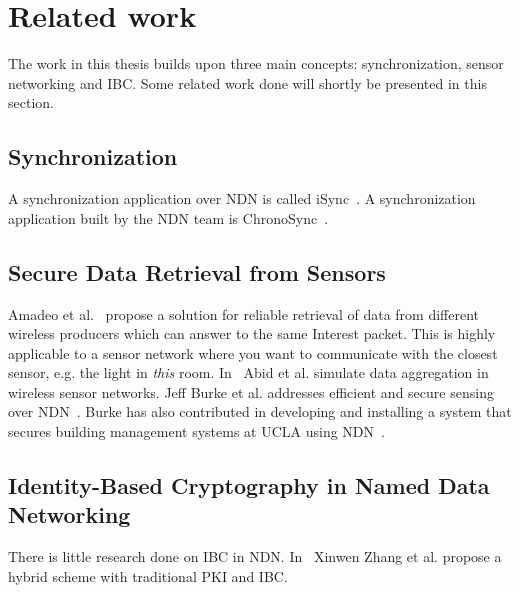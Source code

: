 \section{Related work}
The work in this thesis builds upon three main concepts: synchronization, sensor networking and \gls{IBC}. 
Some related work done will shortly be presented in this section.

\subsection{Synchronization}
A synchronization application over \gls{NDN} is called iSync~\cite{DBLP:conf/acmicn/FuAC14}.
A synchronization application built by the \gls{NDN} team is ChronoSync~\cite{DBLP:conf/icnp/ZhuA13}.

\subsection{Secure Data Retrieval from Sensors}
Amadeo et al.~\cite{DBLP:conf/acmicn/AmadeoCM14} propose a solution for reliable retrieval of data from different wireless producers which can answer to the same Interest packet. This is highly applicable to a sensor network where you want to communicate with the closest sensor, e.g. the light in \textit{this} room.
In~\cite{DBLP:conf/noms/AbidySLF14} Abid et al. simulate data aggregation in wireless sensor networks.
Jeff Burke et al. addresses efficient and secure sensing over \gls{NDN}~\cite{DBLP:conf/nca/BurkeGNT14}.
Burke has also contributed in developing and installing a system that secures building management systems at \gls{UCLA} using \gls{NDN}~\cite{DBLP:journals/network/ShangDMBZ14}.

\subsection{Identity-Based Cryptography in Named Data Networking}
There is little research done on \gls{IBC} in \gls{NDN}. 
In~\cite{DBLP:conf/icnp/ZhangCXWSW11} Xinwen Zhang et al. propose a hybrid scheme with traditional \gls{PKI} and \gls{IBC}.

